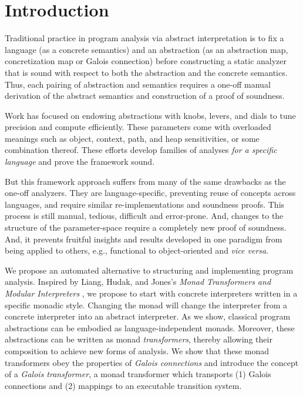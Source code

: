 \section{Introduction}\label{introduction}

\par

Traditional practice in program analysis via abstract interpretation is
to fix a language (as a concrete semantics) and an abstraction (as an
abstraction map, concretization map or Galois connection) before
constructing a static analyzer that is sound with respect to both the
abstraction and the concrete semantics. Thus, each pairing of
abstraction and semantics requires a one-off manual derivation of the
abstract semantics and construction of a proof of soundness.

\par

Work has focused on endowing abstractions with knobs, levers, and dials
to tune precision and compute efficiently. These parameters come with
overloaded meanings such as object, context, path, and heap
sensitivities, or some combination thereof. These efforts develop
families of analyses \emph{for a specific language} and prove the
framework sound.

\par

But this framework approach suffers from many of the same drawbacks as
the one-off analyzers. They are language-specific, preventing reuse of
concepts across languages, and require similar re-implementations and
soundness proofs. This process is still manual, tedious, difficult and
error-prone. And, changes to the structure of the parameter-space
require a completely new proof of soundness. And, it prevents fruitful
insights and results developed in one paradigm from being applied to
others, e.g., functional to object-oriented and \emph{vice versa}.

\par

We propose an automated alternative to structuring and implementing
program analysis. Inspired by Liang, Hudak, and Jones's
\emph{Monad
Transformers and Modular Interpreters} \cite{dvanhorn:Liang1995Monad},
we propose to start with concrete interpreters written in a specific
monadic style. Changing the monad will change the interpreter from a
concrete interpreter into an abstract interpreter. As we show, classical
program abstractions can be embodied as language-independent monads.
Moreover, these abstractions can be written as monad
\emph{transformers}, thereby allowing their composition to achieve new
forms of analysis. We show that these monad transformers obey the
properties of \emph{Galois connections}
\cite{dvanhorn:Cousot1979Systematic} and introduce the concept of a
\emph{Galois transformer}, a monad transformer which transports (1)
Galois connections and (2) mappings to an executable transition system.

